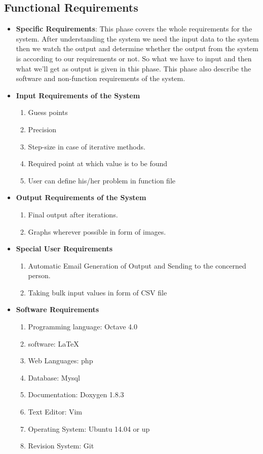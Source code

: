 \subsection{Functional Requirements}
\begin{itemize}
\item {\bf Specific Requirements}: This phase covers the whole requirements 
for the system. After understanding the system we need the input data 
to the system then we watch the output and determine whether the output 
from the system is according to our requirements or not. So what we have 
to input and then what we'll get as output is given in this phase. This 
phase also describe the software and non-function requirements of the 
system.
\item {\bf Input Requirements of the System}
\begin{enumerate} 
\item Guess points
\item Precision
\item Step-size in case of iterative methods.
\item Required point at which value is to be found
\item User can define his/her problem in function file
\end{enumerate}
\vskip 0.5cm
\item {\bf Output Requirements of the System}
\begin{enumerate} 
\item Final output after iterations.
\item Graphs wherever possible in form of images. 
\end{enumerate}
\vskip 0.5cm
\item {\bf Special User Requirements}
\begin{enumerate} 
\item Automatic Email Generation of Output and Sending to the concerned person.
\item Taking bulk input values in form of CSV file
\end{enumerate}
\vskip 0.5cm
\item {\bf Software Requirements}
\begin{enumerate} 
\item Programming language: Octave 4.0
\item software: \LaTeX{}
\item Web Languages: php
\item Database: Mysql 
\item Documentation: Doxygen 1.8.3
\item Text Editor: Vim
\item Operating System: Ubuntu 14.04 or up
\item Revision System: Git


\end{enumerate}
\end{itemize}
